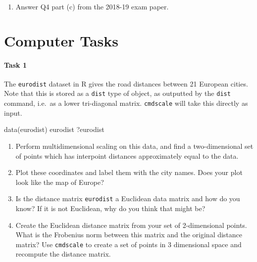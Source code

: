 \documentclass[
]{book}
\newenvironment{Shaded}{\begin{snugshade}}{\end{snugshade}}
\newcommand{\FunctionTok}[1]{\textcolor[rgb]{0.00,0.00,0.00}{#1}}
\newcommand{\NormalTok}[1]{#1}
\providecommand{\tightlist}{%
  \setlength{\itemsep}{0pt}\setlength{\parskip}{0pt}}
\theoremstyle{definition}
\theoremstyle{definition}
\theoremstyle{definition}
\theoremstyle{definition}
\theoremstyle{remark}
\begin{document}
\begin{enumerate}
\def\labelenumi{\arabic{enumi}.}
\setcounter{enumi}{3}
\tightlist
\item
  Answer Q4 part (c) from the 2018-19 exam paper.
\end{enumerate}

\hypertarget{computer-tasks-2}{%
\section{Computer Tasks}\label{computer-tasks-2}}

\hypertarget{task-1-1}{%
\paragraph*{Task 1}\label{task-1-1}}

The \texttt{eurodist} dataset in R gives the road distances between 21 European cities. Note that this is stored as a \texttt{dist} type of object, as outputted by the \texttt{dist} command, i.e.~as a lower tri-diagonal matrix. \texttt{cmdscale} will take this directly as input.

\begin{Shaded}
\begin{Highlighting}[]
\FunctionTok{data}\NormalTok{(eurodist)}
\NormalTok{eurodist}
\NormalTok{?eurodist}
\end{Highlighting}
\end{Shaded}

\begin{enumerate}
\def\labelenumi{\roman{enumi}.}
\item
  Perform multidimensional scaling on this data, and find a two-dimensional set of points which has interpoint distances approximately equal to the data.
\item
  Plot these coordinates and label them with the city names. Does your plot look like the map of Europe?
\item
  Is the distance matrix \texttt{eurodist} a Euclidean data matrix and how do you know? If it is not Euclidean, why do you think that might be?
\item
  Create the Euclidean distance matrix from your set of 2-dimensional points. What is the Frobenius norm between this matrix and the original distance matrix? Use \texttt{cmdscale} to create a set of points in 3 dimensional space and recompute the distance matrix.
\end{enumerate}
\end{document}
